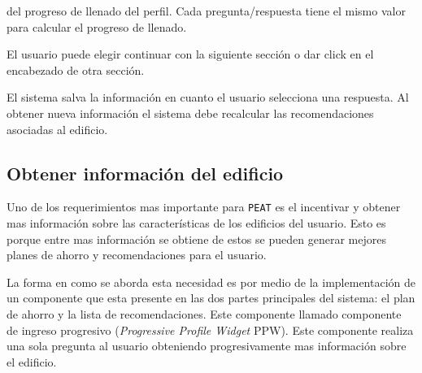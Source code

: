 \begin{usecase}
{\begin{enumerate}
      del progreso de llenado del perfil. Cada pregunta/respuesta tiene el
      mismo valor para calcular el progreso de llenado.
    \end{enumerate}
  \item El usuario puede elegir continuar con la siguiente sección o dar click
    en el encabezado de otra sección.
  \item El sistema salva la información en cuanto el usuario selecciona
    una respuesta. Al obtener nueva información el sistema debe recalcular
    las recomendaciones asociadas al edificio.
  }
\end{usecase}

\subsection{Obtener información del edificio}

Uno de los requerimientos mas importante para \texttt{PEAT} es el incentivar y
obtener mas información sobre las características de los edificios del usuario.
Esto es porque entre mas información se obtiene de estos se pueden generar
mejores planes de ahorro y recomendaciones para el usuario.

La forma en como se aborda esta necesidad es por medio de la implementación
de un componente que esta presente en las dos partes principales del sistema:
el plan de ahorro y la lista de recomendaciones. Este componente llamado
componente de ingreso progresivo (\textit{Progressive Profile Widget} PPW).
Este componente realiza una sola pregunta al usuario obteniendo progresivamente
mas información sobre el edificio.

